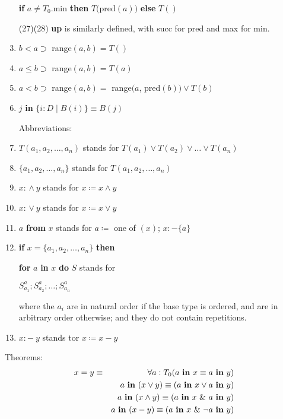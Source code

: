 \begin{enumerate}[wide, nosep, label=(\arabic*)]
	\quad \textbf{if} $a \neq T_0$.min \textbf{then} $T($pred$(a))$ \textbf{else} $T()$
	
	\item[(27)\textendash{}(28)] \textbf{up} is similarly defined, with succ for pred and max for min.
	\setcounter{enumi}{28}

	\item $b < a \supset$ range$(a, b) = T()$
	\item $a \leqslant b \supset$ range$(a, b) = T(a)$
	\item $a < b \supset$ range$(a, b) =$ range$(a$, pred$(b)) \lor T(b)$
	\item $j$ \textbf{in} $\{i:D \mid B(i)\} \equiv B(j)$

	\noindent
	Abbreviations:
	
	\item $T(a_1, a_2, \dots, a_n)$ stands for $T(a_1) \lor T(a_2) \lor \dots \lor T(a_n)$
	\item $\{a_1, a_2, \dots, a_n\}$ stands for $T(a_1, a_2, \dots, a_n)$
	\item $x$: $\land\ y$ stands for $x \coloneq x \land y$
	\item $x$: $\lor\ y$ stands for $x \coloneq x \lor y$
	\item $a$ \textbf{from} $x$ stands for $a \coloneq$ one of $(x)$; $x: - \{a\}$
	\item \textbf{if} $x = \{a_1, a_2, \dots, a_n\}$ \textbf{then}
	
	\qquad\quad \textbf{for} $a$ \textbf{in} $x$ \textbf{do} $S$ stands for
	
	\qquad\quad \quad $S_{a_1}^a; S_{a_2}^a ; \dots; S_{a_n}^a$
	
	\noindent
	where the $a_i$ are in natural order if the base type is ordered, and are in arbitrary order otherwise; and they do not contain repetitions.
	
	\item $x: -\ y$ stands tor $x \coloneq x - y$
\end{enumerate}

\noindent
Theorems:
\begin{eqnarray*}
	x = y &\equiv& \forall a:T_0(a \text{ \textbf{in} } x \equiv a \text{ \textbf{in} } y)\\
	&&a \text{ \textbf{in} } (x \lor y) \equiv (a \text{ \textbf{in} } x \lor a \text{ \textbf{in} } y) \\
	&&a \text{ \textbf{in} } (x \land y) \equiv (a \text{ \textbf{in} } x\ \&\ a \text{ \textbf{in} } y) \\
	&&a \text{ \textbf{in} } (x - y) \equiv (a \text{ \textbf{in} } x\ \&\ \neg a \text{ \textbf{in} } y) \\
\end{eqnarray*}

